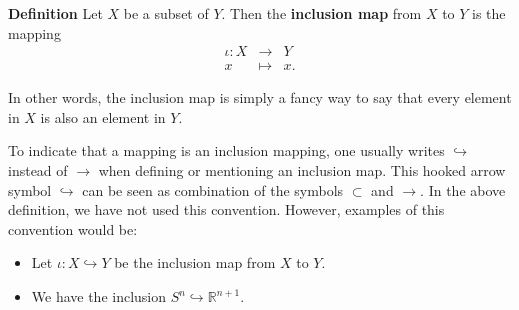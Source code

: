 \documentclass[12pt]{article}
\newcommand{\sR}[0]{\mathbb{R}}
\begin{document}
{\bf Definition} Let $X$ be a subset of $Y$. Then the {\bf inclusion map}
from $X$ to $Y$ is the mapping
\begin{eqnarray*}
\iota: X&\to& Y \\
       x&\mapsto& x.
\end{eqnarray*}

In other words, the inclusion map is simply a fancy way to say
that every element in $X$ is also an element in $Y$.

To indicate that a mapping is an inclusion mapping, one usually writes
 $\hookrightarrow$ instead of $\to$ when defining or mentioning an
inclusion map. This hooked arrow symbol  $\hookrightarrow$ can be 
seen as combination of the symbols $\subset$ and $\to$.
In the above definition, we have not used this convention.
However, examples of this convention would be:
\begin{itemize}
\item
Let $\iota:X\hookrightarrow Y$ be the inclusion map from $X$ to $Y$.
\item
We have the inclusion $S^n\hookrightarrow \sR^{n+1}$.
\end{itemize}
\end{document}
